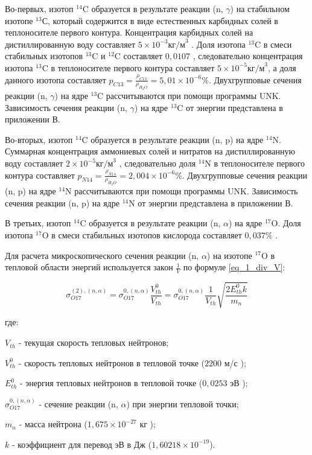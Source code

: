 Во-первых, изотоп $^{14}\text{C}$ образуется в результате реакции (n, $\gamma$) на стабильном изотопе $^{13}\text{С}$, 
который содержится в виде естественных карбидных солей в теплоносителе первого контура. Концентрация карбидных солей на 
дистиллированную воду составляет $5 \times 10^{-3} \text{кг/м}^{3}$ \cite{gost_water}. Доля изотопа $^{13}\text{C}$ в 
смеси стабильных изотопов $^{13}\text{C}$ и $^{12}\text{C}$ составляет $0,0107$ \cite{audi_carbid_sald}, следовательно 
концентрация изотопа $^{13}\text{C}$ в теплоносителе первого контура составляет $5 \times 10^{-5} \text{кг/м}^{3}$, а 
доля данного изотопа составляет $p_{C13} = \frac{\rho_{C13}}{\rho_{H_{2}O}} = 5,01 \times 10^{-6} \%$. Двухгрупповые 
сечения реакции (n, $\gamma$) на ядре $^{13}\text{C}$ рассчитываются при помощи программы UNK. Зависимость сечения 
реакции (n, $\gamma$) на ядре $^{13}\text{C}$ от энергии представлена в приложении В. 

Во-вторых, изотоп $^{14}\text{C}$ образуется в результате реакции (n, p) на ядре $^{14}\text{N}$. Суммарная концентрация 
аммониевых солей и нитратов на дистиллированную воду составляет $2 \times 10^{-5} \text{кг/м}^{3}$ \cite{gost_water}, 
следовательно доля $^{14}\text{N}$ в теплоносителе первого контура составляет 
$p_{N14} = \frac{\rho_{N14}}{\rho_{H_{2}O}} = 2,004 \times 10^{-6} \%$. Двухгрупповые сечения реакции (n, p) на ядре 
$^{14}\text{N}$ рассчитываются при помощи программы UNK. Зависимость сечения реакции (n, p) на ядре $^{14}\text{N}$ от 
энергии представлена в приложении В.

В третьих, изотоп $^{14}\text{C}$ образуется в результате реакции (n, $\alpha$) на ядре $^{17}\text{O}$. Доля изотопа 
$^{17}\text{O}$ в смеси стабильных изотопов кислорода составляет $0,037 \%$ \cite{hoefs_oxygen_isotopes}.

Для расчета микроскопического сечения реакции (n, $\alpha$) на изотопе $^{17}\text{O}$ в тепловой области энергий 
используется закон $\frac{1}{V}$ по формуле \ref{eq_1_div_V}:

\begin{equation}
    \label{eq_1_div_V}
    \sigma_{O17}^{(2), (n, \alpha)} = \sigma_{O17}^{0, (n, \alpha)} \frac{V_{th}^0}{V_{th}} = 
        \sigma_{O17}^{0, (n, \alpha)} \frac{1}{V_{th}} \sqrt{\frac{2 E_{th}^{0} k}{m_{n}}}
\end{equation}

где:
\begin{description}
    \item ${V_{th}}$ - текущая скорость тепловых нейтронов;
    \item ${V_{th}^{0}}$ - скорость тепловых нейтронов в тепловой точке ($2200$ м/с \cite{kruchkov_tpn});
    \item $E_{th}^{0}$ - энергия тепловых нейтронов в тепловой точке ($0,0253$ эВ \cite{kruchkov_tpn});
    \item $\sigma_{O17}^{0, (n, \alpha)}$ - сечение реакции (n, $\alpha$) при энергии тепловой точки;
    \item $m_{n}$ - масса нейтрона ($1,675 \times 10^{-27}$ кг \cite{kruchkov_tpn});
    \item $k$ - коэффициент для перевод эВ в Дж ($1,60218 \times 10^{-19}$).
\end{description}


